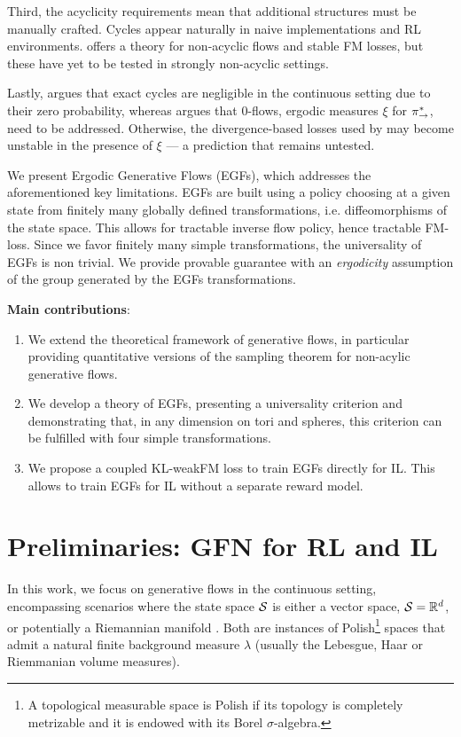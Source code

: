 \documentclass{article}
\theoremstyle{plain}
\theoremstyle{definition}
\theoremstyle{remark}
\theoremstyle{fact}
\begin{document}
    Third, the acyclicity requirements \cite{lahlou2023theory} mean that additional structures must be manually crafted. Cycles appear naturally in naive implementations and RL environments. \citet{brunswic2024theory} offers a theory for non-acyclic flows and stable FM losses, but these have yet to be tested in strongly non-acyclic settings. 
    
    Lastly, \citet{li2023cflownets} argues that exact cycles are negligible in the continuous setting due to their zero probability, whereas \citet{brunswic2024theory} argues that 0-flows, ergodic measures $\xi$ for $\pi_{\rightarrow}^*$, need to be addressed. Otherwise, the divergence-based losses used by \citet{bengio2023gflownet} may become unstable in the presence of $\xi$ — a prediction that remains untested.
    
    We present Ergodic Generative Flows (EGFs), which addresses the aforementioned key limitations. EGFs are built using a policy choosing at a given state from finitely many globally defined transformations, i.e. diffeomorphisms of the state space. This allows for tractable inverse flow policy, hence tractable FM-loss. Since we favor finitely many simple transformations, the universality of EGFs is non trivial. We provide provable guarantee with an {\it ergodicity} \cite{walters2000introduction, kifer2012ergodic} assumption of the group generated by the EGFs transformations. 
    
    \textbf{Main contributions}: 
    \begin{enumerate}
      \item We extend the theoretical framework of generative flows, in particular providing quantitative versions of the sampling theorem for non-acylic generative flows.
      \item  We develop a theory of EGFs, presenting a universality criterion and demonstrating that, in any dimension on tori and spheres, this criterion can be fulfilled with four simple transformations.
      \item  We propose a coupled KL-weakFM loss to train EGFs directly for IL. This allows to train EGFs for IL without a separate reward model.
    \end{enumerate}

\section{Preliminaries: GFN for RL and IL}
\label{sec:preliminaries}
    In this work, we focus on generative flows in the continuous setting, encompassing scenarios where the state space $\mathcal S$ is either a vector space, $\mathcal S = \mathbb{R}^d$, or potentially a Riemannian manifold \cite{lee2018introduction, gemici2016normalizing}. Both are instances of Polish\footnote{A topological measurable space is Polish if its topology is completely metrizable and it is endowed with its Borel $\sigma$-algebra.} spaces that admit a natural finite background measure $\lambda$ (usually the Lebesgue, Haar \cite{halmos2013measureHaar} or Riemmanian volume measures). 
    
\end{document}

